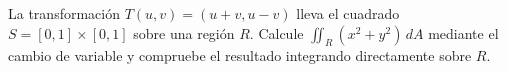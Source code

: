 La transformación $T(u,v)=(u+v,u-v)$ lleva el cuadrado $S=[0,1]\times[0,1]$ sobre una región $R$. Calcule $\iint_R(x^2+y^2)\,dA$ mediante el cambio de variable y compruebe el resultado integrando directamente sobre $R$.
